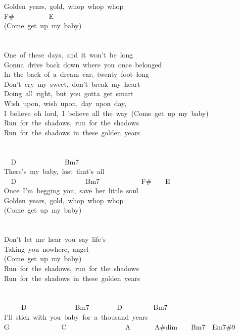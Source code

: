 {Golden\ years,\ gold,\ whop\ whop\ whop\\
F\#\ \ \ \ \ \ \ \ \ \ E\\
(Come\ get\ up\ my\ baby)\\
\\
\\
One\ of\ these\ days,\ and\ it\ won't\ be\ long\\
Gonna\ drive\ back\ down\ where\ you\ once\ belonged\\
In\ the\ back\ of\ a\ dream\ car,\ twenty\ foot\ long\\
Don't\ cry\ my\ sweet,\ don't\ break\ my\ heart\\
Doing\ all\ right,\ but\ you\ gotta\ get\ smart\\
Wish\ upon,\ wish\ upon,\ day\ upon\ day,\\
I\ believe\ oh\ lord,\ I\ believe\ all\ the\ way\ (Come\ get\ up\ my\ baby)\\
Run\ for\ the\ shadows,\ run\ for\ the\ shadows\\
Run\ for\ the\ shadows\ in\ these\ golden\ years\\
\\
\\
\ \ D\ \ \ \ \ \ \ \ \ \ \ \ \ \ Bm7\\
There's\ my\ baby,\ lost\ that's\ all\\
\ \ D\ \ \ \ \ \ \ \ \ \ \ \ \ \ \ \ \ \ \ \ Bm7\ \ \ \ \ \ \ \ \ \ \ \ F\#\ \ \ \ E\\
Once\ I'm\ begging\ you,\ save\ her\ little\ soul\\
Golden\ years,\ gold,\ whop\ whop\ whop\\
(Come\ get\ up\ my\ baby)\\
\\
\\
Don't\ let\ me\ hear\ you\ say\ life's\ \\
Taking\ you\ nowhere,\ angel\\
(Come\ get\ up\ my\ baby)\\
Run\ for\ the\ shadows,\ run\ for\ the\ shadows\\
Run\ for\ the\ shadows\ in\ these\ golden\ years\\
\\
\\
\ \ \ \ \ D\ \ \ \ \ \ \ \ \ \ \ \ \ \ Bm7\ \ \ \ \ \ \ \ D\ \ \ \ \ \ \ \ \ Bm7\\
I'll\ stick\ with\ you\ baby\ for\ a\ thousand\ years\\
G\ \ \ \ \ \ \ \ \ \ \ \ \ \ \ C\ \ \ \ \ \ \ \ \ \ \ \ \ \ \ \ \ A\ \ \ \ \ \ \ A\#dim\ \ \ \ Bm7\ \ Em7\#9\\
}
